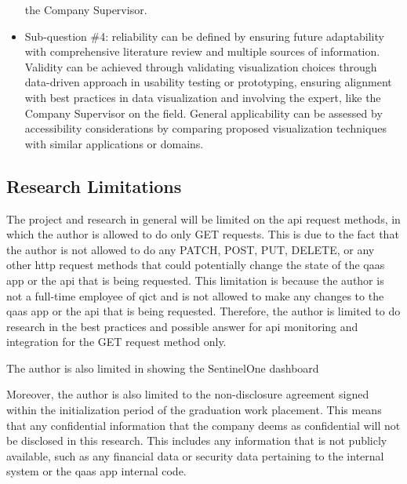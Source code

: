 \begin{multicols}{2}
\begin{itemize}[label=-]
                  the Company Supervisor.
            \item Sub-question \#4: reliability can be defined by ensuring future adaptability with comprehensive
                  literature review and multiple sources of information. Validity can be achieved through validating
                  visualization choices through data-driven approach in usability testing or  prototyping, ensuring
                  alignment with best practices in data visualization and involving the expert, like the Company
                  Supervisor on the field. General applicability can be assessed by accessibility considerations by
                  comparing proposed visualization techniques with similar applications or domains.
      \end{itemize}
      \subsection{Research Limitations}
      The project and research in general will be limited on the \acrshort{api} request methods, in which the author
      is allowed to do only GET requests. This is due to the fact that the author is not allowed to do any PATCH,
      POST, PUT, DELETE, or any other \acrshort{http} request methods that could potentially change the state of the
      \acrshort{qaas} app or the \acrshort{api} that is being requested. This limitation is because the author is not a
      full-time employee of \acrshort{qict} and is not allowed to make any changes to the \acrshort{qaas} app or the
      \acrshort{api} that is being requested. Therefore, the author is limited to do research in the best practices
      and possible answer for \acrshort{api} monitoring and integration for the GET request method only.

      The author is also limited in showing the SentinelOne dashboard

      Moreover, the author is also limited to the non-disclosure agreement signed within the initialization period of
      the graduation work placement. This means that any confidential information that the company deems as confidential
      will not be disclosed in this research. This includes any information that is not publicly available, such as any
      financial data or security data pertaining to the internal system or the \acrshort{qaas} app internal code.

\end{multicols}
